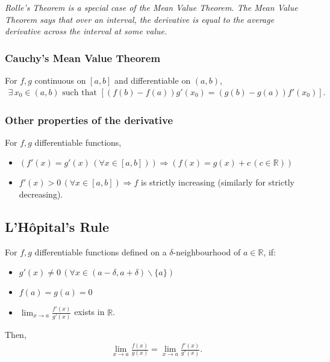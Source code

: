 \documentclass[a4paper, 12pt, twoside]{article}
\begin{document}
\textit{Rolle's Theorem is a special case of the Mean Value Theorem.
      The Mean Value Theorem says that over an interval, the derivative is
      equal to the average derivative across the interval at some value.}

\subsubsection{Cauchy's Mean Value Theorem}

For $f, g$ continuous on $[a, b]$ and differentiable on $(a, b)$,
\begin{align*}
      \exists \, x_0 \in (a, b) \text{ such that }
      \left[(f(b) - f(a))g'(x_0) = (g(b) - g(a))f'(x_0)\right].
\end{align*}

\subsubsection{Other properties of the derivative}

For $f, g$ differentiable functions,

\begin{itemize}
      \item $(f'(x) = g'(x) \, (\forall x \in [a, b])) \Rightarrow
                  (f(x) = g(x) + c \, (c \in \mathbb{R}))$
      \item $f'(x) > 0 \, (\forall x \in [a, b]) \Rightarrow f$ is
            strictly increasing (similarly for strictly decreasing).
\end{itemize}

\subsection{L'Hôpital's Rule}

For $f, g$ differentiable functions defined on a $\delta$-neighbourhood
of $a \in \mathbb{R}$, if:

\begin{itemize}
      \item $g'(x) \neq 0 \, (\forall x \in
                  (a - \delta, a + \delta)\backslash\{a\})$
      \item $f(a) = g(a) = 0$
      \item $\lim_{x\to a}\frac{f'(x)}{g'(x)}$ exists in $\mathbb{R}$.
\end{itemize}

Then,
\begin{align*}
      \lim_{x\to a}\frac{f(x)}{g(x)} = \lim_{x\to a}\frac{f'(x)}{g'(x)}.
\end{align*}
\end{document}
